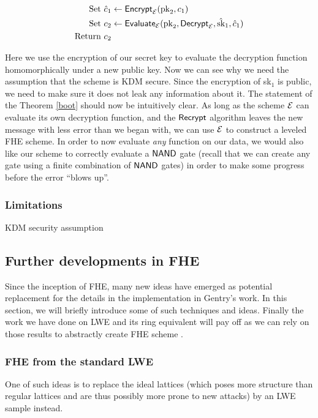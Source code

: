 \begin{align*}
	\text{Set } \hat{c}_1 & \leftarrow \textsf{Encrypt}_{\mathcal{E}} (\text{pk}_2, c_1) \\
	\text{Set } c_2 & \leftarrow \textsf{Evaluate}_{\mathcal{E}} (\text{pk}_2, \textsf{Decrypt}_{\mathcal{E}}, \hat{\text{sk}}_1, \hat{c}_1) \\
	\text{Return } c_2 &
\end{align*}

Here we use the encryption of our secret key to evaluate the decryption function homomorphically under a new public key. Now we can see why we need the assumption that the scheme is KDM secure. Since the encryption of sk$_1$ is public, we need to make sure it does not leak any information about it. The statement of the Theorem \ref{boot} should now be intuitively clear. As long as the scheme $\mathcal{E}$ can evaluate its own decryption function, and the $\textsf{Recrypt}$ algorithm leaves the new message with less error than we began with, we can use $\mathcal{E}$ to construct a leveled FHE scheme. In order to now evaluate \textit{any} function on our data, we would also like our scheme to correctly evaluate a $\textsf{NAND}$ gate (recall that we can create any gate using a finite combination of $\textsf{NAND}$ gates) in order to make some progress before the error ``blows up''.

\subsubsection{Limitations}
KDM security assumption

\subsection{Further developments in FHE}
Since the inception of FHE, many new ideas have emerged as potential replacement for the details in the implementation in Gentry's work. In this section, we will briefly introduce some of such techniques and ideas. Finally the work we have done on LWE and its ring equivalent will pay off as we can rely on those results to abstractly create FHE scheme . 

\subsubsection{FHE from the standard LWE}
 One of such ideas is to replace the ideal lattices (which poses more structure than regular lattices and are thus possibly more prone to new attacks) by an LWE sample instead.


